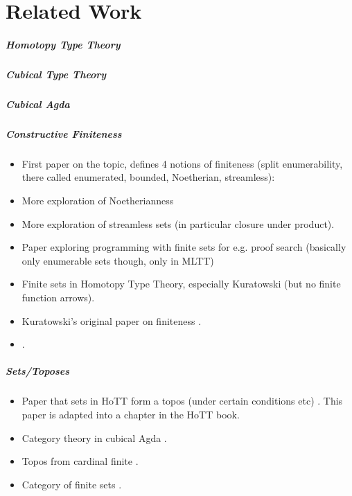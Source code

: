 \chapter{Related Work}
\paragraph{Homotopy Type Theory} \cite{hottbook}
\paragraph{Cubical Type Theory} \cite{cohenCubicalTypeTheory2016}
\paragraph{Cubical Agda} \cite{vezzosiCubicalAgdaDependently2019} 
\paragraph{Constructive Finiteness}
\begin{itemize}
  \item First paper on the topic, defines 4 notions of finiteness (split
    enumerability, there called enumerated, bounded, Noetherian, streamless):
    \cite{coquandConstructivelyFinite2010}
  \item More exploration of Noetherianness
    \cite{firsovVariationsNoetherianness2016}
  \item More exploration of streamless sets
    \cite{parmannInvestigatingStreamlessSets2015} (in particular closure under
    product).
  \item Paper exploring programming with finite sets for e.g. proof search
    \cite{firsovDependentlyTypedProgramming2015} (basically only enumerable sets
    though, only in MLTT)
  \item Finite sets in Homotopy Type Theory, especially Kuratowski
    \cite{fruminFiniteSetsHomotopy2018} (but no finite function arrows).
  \item Kuratowski's original paper on finiteness
    \cite{kuratowskiNotionEnsembleFini1920}.
  \item \cite{smolkaHereditarilyFiniteSets2016}.
\end{itemize}
\paragraph{Sets/Toposes}
\begin{itemize}
  \item Paper that sets in HoTT form a topos (under certain conditions
    etc) \cite{rijkeSetsHomotopyType2015}.
    This paper is adapted into a chapter in the HoTT book.
  \item Category theory in cubical Agda
    \cite{iversenUnivalentCategoriesFormalization2018}.
  \item Topos from cardinal finite \cite{henryToposesGeneratedCardinal2018}.
  \item Category of finite sets \cite{solovevCategoryFiniteSets1983}.
\end{itemize}
